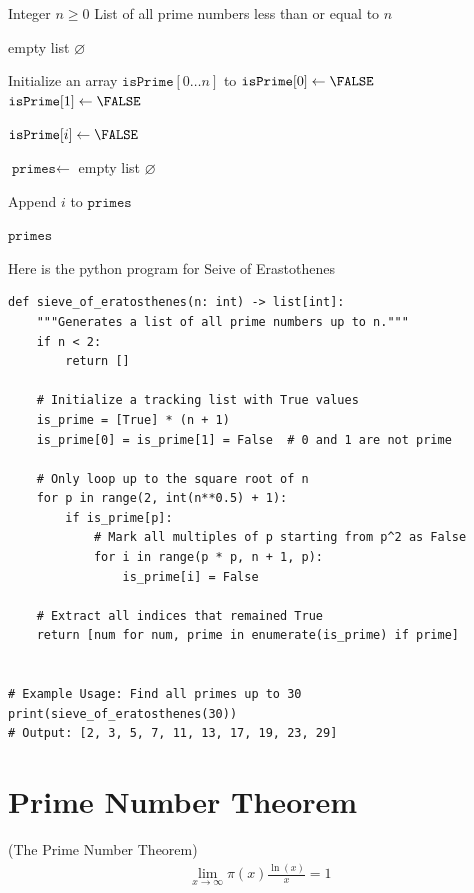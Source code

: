 \documentclass[a4paper, 12pt]{book} %
\begin{document}
\begin{algorithm}[H]
\caption{Sieve of Eratosthenes}
\label{alg:sieve}
\begin{algorithmic}[1]

\REQUIRE Integer $n \geq 0$
\ENSURE List of all prime numbers less than or equal to $n$

    \RETURN empty list $\varnothing$
\ENDIF

\STATE Initialize an array $\texttt{isPrime}[0\ldots n]$ to \TRUE
\STATE $\texttt{isPrime}[0] \gets \FALSE$
\STATE $\texttt{isPrime}[1] \gets \FALSE$

            \STATE $\texttt{isPrime}[i] \gets \FALSE$
        \ENDFOR
    \ENDIF
\ENDFOR

\STATE $\texttt{primes} \gets$ empty list $\varnothing$

        \STATE Append $i$ to $\texttt{primes}$
    \ENDIF
\ENDFOR

\RETURN $\texttt{primes}$

\end{algorithmic}
\end{algorithm}



Here is the python program for Seive of Erastothenes
\begin{verbatim}
def sieve_of_eratosthenes(n: int) -> list[int]:
    """Generates a list of all prime numbers up to n."""
    if n < 2:
        return []

    # Initialize a tracking list with True values
    is_prime = [True] * (n + 1)
    is_prime[0] = is_prime[1] = False  # 0 and 1 are not prime

    # Only loop up to the square root of n
    for p in range(2, int(n**0.5) + 1):
        if is_prime[p]:
            # Mark all multiples of p starting from p^2 as False
            for i in range(p * p, n + 1, p):
                is_prime[i] = False

    # Extract all indices that remained True
    return [num for num, prime in enumerate(is_prime) if prime]


# Example Usage: Find all primes up to 30
print(sieve_of_eratosthenes(30))
# Output: [2, 3, 5, 7, 11, 13, 17, 19, 23, 29]
\end{verbatim}


\section{Prime Number Theorem}
\begin{theorem}
    (The Prime Number Theorem) 
    \begin{align}
        \lim_{x \rightarrow \infty} \pi(x) \frac{\ln(x)}{x} = 1
    \end{align}
\end{theorem}
\end{document}
